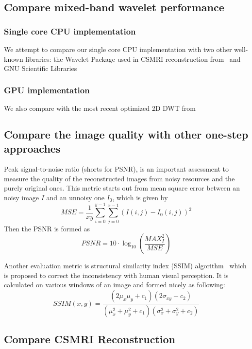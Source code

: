 \subsection{Compare mixed-band wavelet performance}
\subsubsection{Single core CPU implementation}
We attempt to compare our single core CPU implementation with two other well-known libraries: the Wavelet Package used in CSMRI reconstruction from~\cite{lustig_compressed_2008}  and GNU Scientific Libraries~\cite{GSL}
\subsubsection{GPU implementation}
We also compare with the most recent optimized 2D DWT from ~\cite{matela_gpu_2009} 
\subsection{Compare the image quality with other one-step approaches}
Peak signal-to-noise ratio (shorts for PSNR), is an important assessment to measure the quality of the reconstructed images from noisy resources and the purely original ones. This metric starts out from mean square error between an noisy image $I$ and an unnoisy one $I_0$, which is given by
\[MSE = \frac{1}{{xy}}\sum\limits_{i = 0}^{y - 1} {\sum\limits_{j = 0}^{x - 1} {{{\left( {I\left( {i,j} \right) - {I_0}\left( {i,j} \right)} \right)}^2}} } \]
Then the PSNR is formed as
\[PSNR = 10 \cdot {\log _{10}}\left( {\frac{{MAX_I^2}}{{MSE}}} \right)\]

Another evaluation metric is structural similarity index (SSIM) algorithm~\cite{wang_image_2004} which is proposed to correct the inconsistency with human visual perception. It is calculated on various windows of an image and formed nicely as following:
\[SSIM\left( {x,y} \right) = \frac{{\left( {2{\mu _x}{\mu _y} + {c_1}} \right)\left( {2{\sigma _{xy}} + {c_2}} \right)}}{{\left( {\mu _x^2 + \mu _y^2 + {c_1}} \right)\left( {\sigma _x^2 + \sigma _y^2 + {c_2}} \right)}}\]



\subsection{Compare CSMRI Reconstruction}

